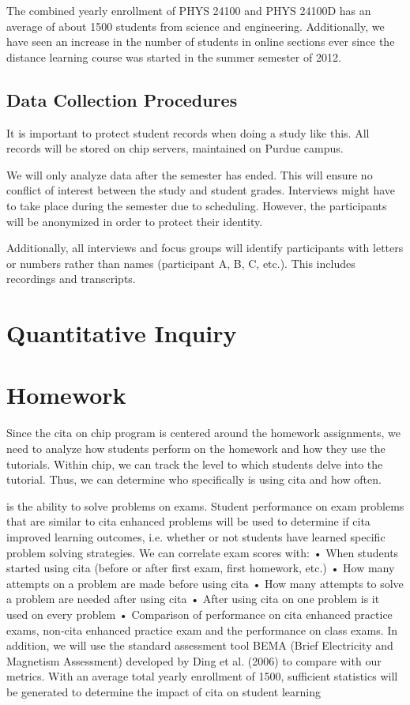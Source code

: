 The combined yearly enrollment of PHYS 24100 and PHYS 24100D has an average of about 1500 students from science and engineering. Additionally, we have seen an increase in the number of students in online sections ever since the distance learning course was started in the summer semester of 2012.

\subsection{Data Collection Procedures}

It is important to protect student records when doing a study like this. All records will be stored on \gls{chip} servers, maintained on Purdue campus.

We will only analyze data after the semester has ended. This will ensure no conflict of interest between the study and student grades. Interviews might have to take place during the semester due to scheduling. However, the participants will be anonymized in order to protect their identity.

Additionally, all interviews and focus groups will identify participants with letters or numbers rather than names (participant A, B, C, etc.). This includes recordings and transcripts.

\section{Quantitative Inquiry}

\section{Homework}

Since the \gls{cita} on \gls{chip} program is centered around the homework assignments, we need to analyze how students perform on the homework and how they use the tutorials. Within \gls{chip}, we can track the level to which students delve into the tutorial. Thus, we can determine who specifically is using \gls{cita} and how often.

 is the ability to solve problems on exams. Student
performance on exam problems that are similar to \gls{cita} enhanced problems will be used to
determine if \gls{cita} improved learning outcomes, i.e. whether or not students have learned
specific problem solving strategies. We can correlate exam scores with:
• When students started using \gls{cita} (before or after first exam, first homework, etc.)
• How many attempts on a problem are made before using \gls{cita}
• How many attempts to solve a problem are needed after using \gls{cita}
• After using \gls{cita} on one problem is it used on every problem
• Comparison of performance on \gls{cita} enhanced practice exams, non-\gls{cita} enhanced
practice exam and the performance on class exams.
In addition, we will use the standard assessment tool BEMA (Brief Electricity and Magnetism
Assessment) developed by Ding et al. (2006) to compare with our metrics. With an average total
yearly enrollment of 1500, sufficient statistics will be generated to determine the impact of \gls{cita}
on student learning

